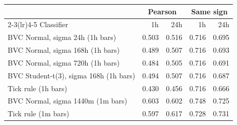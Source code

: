 \begin{tabular}{lrrrr}
\toprule
 & \multicolumn{2}{c}{Pearson} & \multicolumn{2}{c}{Same sign}\\
\cmidrule(lr){2-3}\cmidrule(lr){4-5} Classifier & 1h & 24h & 1h & 24h\\
\midrule
BVC Normal, sigma 24h (1h bars) & 0.503 & 0.516 & 0.716 & 0.695\\
BVC Normal, sigma 168h (1h bars) & 0.489 & 0.507 & 0.716 & 0.693\\
BVC Normal, sigma 720h (1h bars) & 0.484 & 0.505 & 0.716 & 0.691\\
BVC Student-t(3), sigma 168h (1h bars) & 0.494 & 0.507 & 0.716 & 0.687\\
Tick rule (1h bars) & 0.430 & 0.456 & 0.716 & 0.666\\
BVC Normal, sigma 1440m (1m bars) & 0.603 & 0.602 & 0.748 & 0.725\\
Tick rule (1m bars) & 0.597 & 0.617 & 0.728 & 0.731\\
\bottomrule
\end{tabular}
